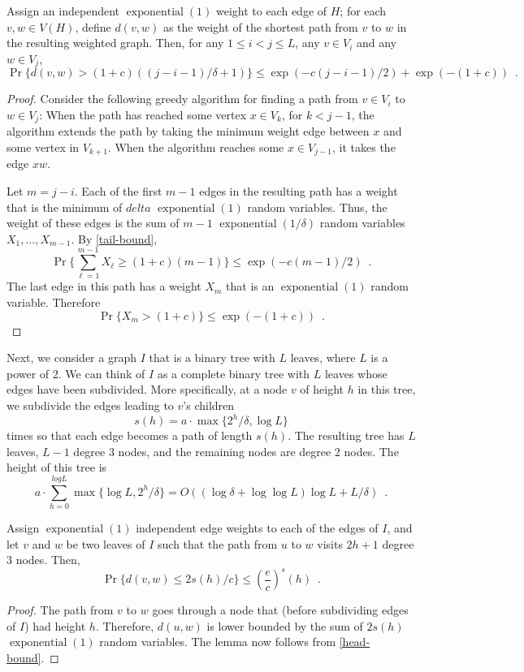 \documentclass{patmorin}
\DeclareMathOperator{\exponential}{exponential}
\begin{document}
\begin{lem}
   Assign an independent $\exponential(1)$ weight to each edge of $H$;
   for each $v,w\in V(H)$, define $d(v,w)$ as the weight of the shortest path from $v$
   to $w$ in the resulting weighted graph.  Then, for any $1\le i<
   j\le L$, any $v\in V_i$ and any $w\in V_j$,
   \[
       \Pr\{d(v,w) > (1+c)((j-i-1)/\delta + 1) \} \le
         \exp(-c(j-i-1)/2) + \exp(-(1+c)) \enspace .
   \]
\end{lem}

\begin{proof}
   Consider the following greedy algorithm for finding a path from $v\in V_i$
   to $w\in V_j$: When the path has reached some vertex $x\in V_{k}$, for
   $k<j-1$, the algorithm extends the path by taking the minimum weight
   edge between $x$ and some vertex in $V_{k+1}$.  When the algorithm
   reaches some $x\in V_{j-1}$, it takes the edge $xw$.

   Let $m=j-i$.
   Each of the first $m-1$ edges in the resulting path has a
   weight that is the minimum of $delta$ $\exponential(1)$ random
   variables.  Thus, the weight of these edges is the sum of $m-1$
   $\exponential(1/\delta)$ random variables $X_1,\ldots,X_{m-1}$.  
   By \eqref{tail-bound}, 
   \[
     \Pr\{\sum_{\ell=1}^{m-1} X_\ell \ge (1+c)(m-1) \} \le 
        \exp(-c(m-1)/2) \enspace .
   \]
   The last edge in this path has a weight $X_m$ that is an $\exponential(1)$
   random variable.  Therefore
   \[
      \Pr\{X_m > (1+c)\} \le \exp(-(1+c)) \enspace .
   \]
\end{proof}

Next, we consider a graph $I$ that is a binary tree with $L$ leaves,
where $L$ is a power of 2.  We can think of $I$ as a complete binary tree
with $L$ leaves whose edges have been subdivided.  More specifically,
at a node $v$ of height $h$ in this tree, we subdivide the edges leading
to $v$'s children
\[
   s(h) = a\cdot\max\{2^h/\delta,\log L\} 
\]
times so that each edge becomes a path of length $s(h)$.  The resulting
tree has $L$ leaves, $L-1$ degree 3 nodes, and the remaining nodes are
degree 2 nodes.  The height of this tree is
\[
   a\cdot\sum_{h=0}^{log L} \max\{\log L, 2^h/\delta\}
     = O( (\log\delta+\log\log L)\log L + L/\delta ) \enspace .
\]
\begin{lem}
   Assign $\exponential(1)$ independent edge weights to each of the edges
   of $I$, and let $v$ and $w$ be two leaves of $I$ such that the path from $u$ to $w$ visits $2h+1$ degree 3 nodes.  Then, 
   \[  
        \Pr\{d(v,w) \le 2s(h)/c  \} \le \left(\frac{e}{c}\right)^s(h) \enspace .
   \]
\end{lem}

\begin{proof}
   The path from $v$ to $w$ goes through a node that (before subdividing edges of $I$) had height $h$. Therefore, $d(u,w)$ is lower bounded by the sum of $2s(h)$ $\exponential(1)$ random variables.  The lemma now follows from \eqref{head-bound}.
\end{proof}
\end{document}
